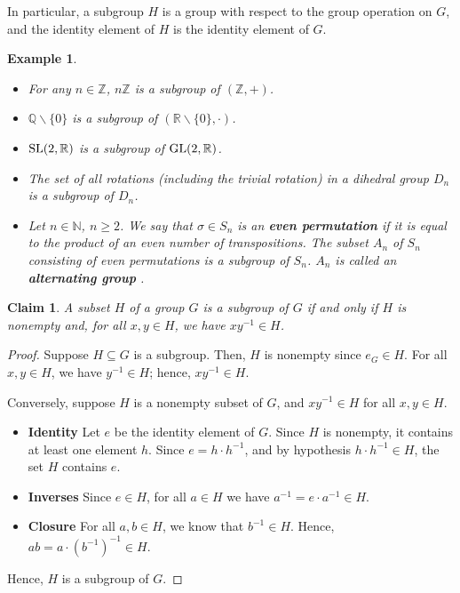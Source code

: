 \documentclass[a4paper,12pt]{report}
\newcommand{\bs}{\backslash}
\newcounter{statement}
\numberwithin{statement}{chapter}
\newtheorem{claim}[statement]{Claim}
\newtheorem{eg}[statement]{\bf Example}
\numberwithin{equation}{chapter}
\numberwithin{section}{chapter}
\numberwithin{subsection}{section}
\begin{document}
In particular, a subgroup $H$ is a group with respect to the group operation on $G$,
and the identity element of $H$ is the identity element of $G$.





\begin{eg}
\label{eg:subgroups}


\begin{itemize}
\item 
For any $n \in \mathbb{Z}$,
$n\mathbb{Z}$ is a subgroup of $(\mathbb{Z}, +)$.

\item 
$\mathbb{Q}\bs\{0\}$ is a subgroup of $(\mathbb{R}\bs\{0\}, \cdot)$.

\item 
${\rm SL}(2, \mathbb{R})$ is a subgroup of ${\rm GL}(2, \mathbb{R})$.

\item 
The set of all rotations (including the trivial rotation) in a dihedral group $D_n$
is a subgroup of $D_n$.

\item 
Let $n \in \mathbb{N}$, $n \geq 2$.
We say that $\sigma \in S_n$ is an  {\bf even permutation} 
if it is equal to the product of an even number of transpositions.
The subset $A_n$ of $S_n$ consisting of even permutations is a subgroup of $S_n$.
$A_n$ is called an  {\bf alternating group} .
\end{itemize}
\end{eg}

\begin{claim}
A subset $H$ of a group $G$ is a subgroup of $G$ if and only if $H$ is nonempty
and, for all $x, y \in H$, we have $xy^{-1} \in H$.
\end{claim}
\begin{proof}

Suppose $H \subseteq G$ is a subgroup.
Then, $H$ is nonempty since $e_G \in H$.
For all $x, y \in H$, we have $y^{-1} \in H$;
hence, $xy^{-1} \in H$.



Conversely, suppose $H$ is a nonempty subset of $G$,
and $xy^{-1} \in H$ for all $x, y \in H$.




\begin{itemize}
\item 
 {\bf Identity}  Let $e$ be the identity element of $G$.
Since $H$ is nonempty, it contains at least one element $h$.
Since $e = h \cdot h^{-1}$, and by hypothesis $h\cdot h^{-1} \in H$, the set $H$ contains $e$.

\item 
 {\bf Inverses} 
Since $e \in H$, for all $a \in H$ we have $a^{-1} = e\cdot a^{-1} \in H$.

\item 
 {\bf Closure} 
For all $a, b \in H$, we know that $b^{-1} \in H$.  Hence,
$ab = a\cdot(b^{-1})^{-1} \in H$.
\end{itemize}

Hence, $H$ is a subgroup of $G$.


\end{proof}
\end{document}
